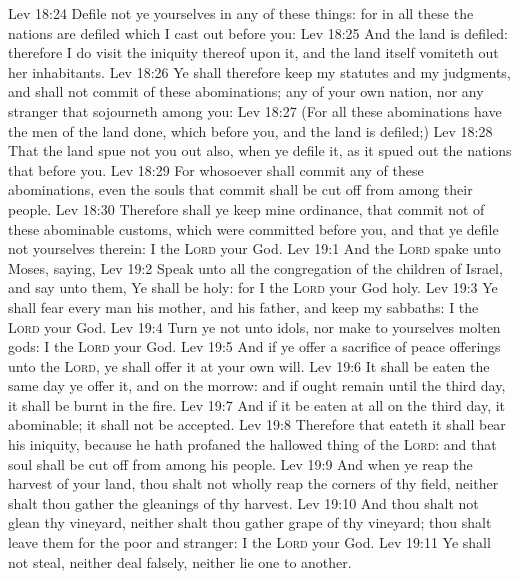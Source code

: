\vs Lev 18:24 Defile not ye yourselves in any of these things: for in all these the nations are defiled which I cast out before you:
\vs Lev 18:25 And the land is defiled: therefore I do visit the iniquity thereof upon it, and the land itself vomiteth out her inhabitants.
\vs Lev 18:26 Ye shall therefore keep my statutes and my judgments, and shall not commit  of these abominations;  any of your own nation, nor any stranger that sojourneth among you:
\vs Lev 18:27 (For all these abominations have the men of the land done, which  before you, and the land is defiled;)
\vs Lev 18:28 That the land spue not you out also, when ye defile it, as it spued out the nations that  before you.
\vs Lev 18:29 For whosoever shall commit any of these abominations, even the souls that commit  shall be cut off from among their people.
\vs Lev 18:30 Therefore shall ye keep mine ordinance, that  commit not  of these abominable customs, which were committed before you, and that ye defile not yourselves therein: I  the \textsc{Lord} your God.
\vs Lev 19:1 And the \textsc{Lord} spake unto Moses, saying,
\vs Lev 19:2 Speak unto all the congregation of the children of Israel, and say unto them, Ye shall be holy: for I the \textsc{Lord} your God  holy.
\vs Lev 19:3 Ye shall fear every man his mother, and his father, and keep my sabbaths: I  the \textsc{Lord} your God.
\vs Lev 19:4 Turn ye not unto idols, nor make to yourselves molten gods: I  the \textsc{Lord} your God.
\vs Lev 19:5 And if ye offer a sacrifice of peace offerings unto the \textsc{Lord}, ye shall offer it at your own will.
\vs Lev 19:6 It shall be eaten the same day ye offer it, and on the morrow: and if ought remain until the third day, it shall be burnt in the fire.
\vs Lev 19:7 And if it be eaten at all on the third day, it  abominable; it shall not be accepted.
\vs Lev 19:8 Therefore  that eateth it shall bear his iniquity, because he hath profaned the hallowed thing of the \textsc{Lord}: and that soul shall be cut off from among his people.
\vs Lev 19:9 And when ye reap the harvest of your land, thou shalt not wholly reap the corners of thy field, neither shalt thou gather the gleanings of thy harvest.
\vs Lev 19:10 And thou shalt not glean thy vineyard, neither shalt thou gather  grape of thy vineyard; thou shalt leave them for the poor and stranger: I  the \textsc{Lord} your God.
\vs Lev 19:11 Ye shall not steal, neither deal falsely, neither lie one to another.
